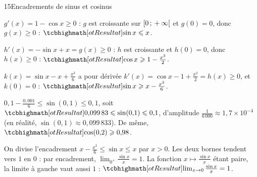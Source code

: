 \begin{corrige}{15}{Encadrements de sinus et cosinus}
\noindent
\begin{minipage}[t]{0.54\linewidth}\vspace{0pt}\raggedright
{}
\begin{questions}
  \item $g'(x)=1-\cos x\geq0$ : $g$ est croissante sur $\mathopen{[}0\,{;}\,+\infty\mathclose{[}$ et $g(0)=0$, donc $g(x)\geq0$ : $\res{\sin x\leq x}$.
  \item $h'(x)=-\sin x+x=g(x)\geq0$ : $h$ est croissante et $h(0)=0$, donc $h(x)\geq0$ : $\res{\cos x\geq1-\frac{x^{2}}{2}}$.
  \item $k(x)=\sin x-x+\frac{x^{3}}{6}$ a pour dérivée $k'(x)=\cos x-1+\frac{x^{2}}{2}=h(x)\geq0$, et $k(0)=0$ : $\res{\sin x\geq x-\frac{x^{3}}{6}}$.
\end{questions}
\begin{questions}[resume]
  \item $0{,}1-\frac{0{,}001}{6}\leq\sin(0{,}1)\leq0{,}1$, soit $\res{0{,}099\,83\leq\sin(0{,}1)\leq0{,}1}$, d'amplitude
    $\frac{1}{6\,000}\approx1{,}7\times10^{-4}$ (en réalité, $\sin(0{,}1)\approx0{,}099\,833$). De même, $\res{\cos(0{,}2)\geq0{,}98}$.
  \item On divise l'encadrement $x-\frac{x^{3}}{6}\leq\sin x\leq x$ par $x>0$. Les deux bornes tendent vers $1$ en $0$ : par
    encadrement, $\lim_{0^{+}}\frac{\sin x}{x}=1$. La fonction $x\mapsto\frac{\sin x}{x}$ étant paire, la limite à gauche vaut aussi
    $1$ : $\res{\lim_{x\to0}\frac{\sin x}{x}=1}$.
\end{questions}
\end{minipage}\hfill
\begin{minipage}[t]{0.42\linewidth}\vspace{2mm}
\centering
{}\\[0.5mm]
\end{minipage}
\end{corrige}
